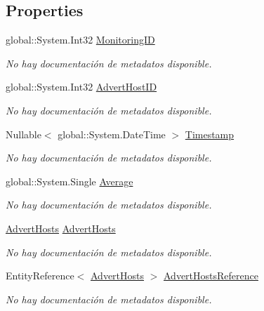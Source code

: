 \subsection*{Properties}
\begin{DoxyCompactItemize}
\item 
global\-::\-System.\-Int32 \hyperlink{class_game_memory_1_1_monitorings_a26160580b6c9b96a7773135cec3a0409}{Monitoring\-I\-D}
\begin{DoxyCompactList}\small\item\em No hay documentación de metadatos disponible. \end{DoxyCompactList}\item 
global\-::\-System.\-Int32 \hyperlink{class_game_memory_1_1_monitorings_af6570a77b6f0cc4a462e4421ce5f913c}{Advert\-Host\-I\-D}
\begin{DoxyCompactList}\small\item\em No hay documentación de metadatos disponible. \end{DoxyCompactList}\item 
Nullable$<$ global\-::\-System.\-Date\-Time $>$ \hyperlink{class_game_memory_1_1_monitorings_aa2aab4600abf54e97998d55a8c6a7520}{Timestamp}
\begin{DoxyCompactList}\small\item\em No hay documentación de metadatos disponible. \end{DoxyCompactList}\item 
global\-::\-System.\-Single \hyperlink{class_game_memory_1_1_monitorings_a7e93e01d5c9831e48213a03aa37ac386}{Average}
\begin{DoxyCompactList}\small\item\em No hay documentación de metadatos disponible. \end{DoxyCompactList}\item 
\hyperlink{class_game_memory_1_1_advert_hosts}{Advert\-Hosts} \hyperlink{class_game_memory_1_1_monitorings_a10100dcedb82f94509cc9e9c62c25db5}{Advert\-Hosts}
\begin{DoxyCompactList}\small\item\em No hay documentación de metadatos disponible. \end{DoxyCompactList}\item 
Entity\-Reference$<$ \hyperlink{class_game_memory_1_1_advert_hosts}{Advert\-Hosts} $>$ \hyperlink{class_game_memory_1_1_monitorings_aac0e39b01bbc04291109a4d934708151}{Advert\-Hosts\-Reference}
\begin{DoxyCompactList}\small\item\em No hay documentación de metadatos disponible. \end{DoxyCompactList}\end{DoxyCompactItemize}


